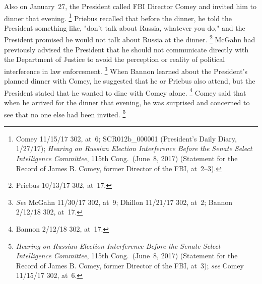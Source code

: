 Also on January~27, the President called FBI Director Comey and invited him to dinner that evening.%
\footnote{Comey 11/15/17 302, at~6;
SCR012b\_000001 (President's Daily Diary, 1/27/17);
\textit{Hearing on Russian Election Interference Before the Senate Select Intelligence Committee}, 115th Cong.\ (June~8, 2017) (Statement for the Record of James B. Comey, former Director of the FBI, at~2--3).}
Priebus recalled that before the dinner, he told the President something like, "don't talk about Russia, whatever you do," and the President promised he would not talk about Russia at the dinner.%
\footnote{Priebus 10/13/17 302, at~17.}
McGahn had previously advised the President that he should not communicate directly with the Department of Justice to avoid the perception or reality of political interference in law enforcement.%
\footnote{\textit{See} McGahn 11/30/17 302, at~9;
Dhillon 11/21/17 302, at~2;
Bannon 2/12/18 302, at~17.}
When Bannon learned about the President's planned dinner with Comey, he suggested that he or Priebus also attend, but the President stated that he wanted to dine with Comey alone.%
\footnote{Bannon 2/12/18 302, at~17.}
Comey said that when he arrived for the dinner that evening, he was surprised and concerned to see that no one else had been invited.%
\footnote{\textit{Hearing on Russian Election Interference Before the Senate Select Intelligence Committee}, 115th Cong.\ (June~8, 2017) (Statement for the Record of James B. Comey, former Director of the FBI, at~3);
\textit{see} Comey 11/15/17 302, at~6.}

